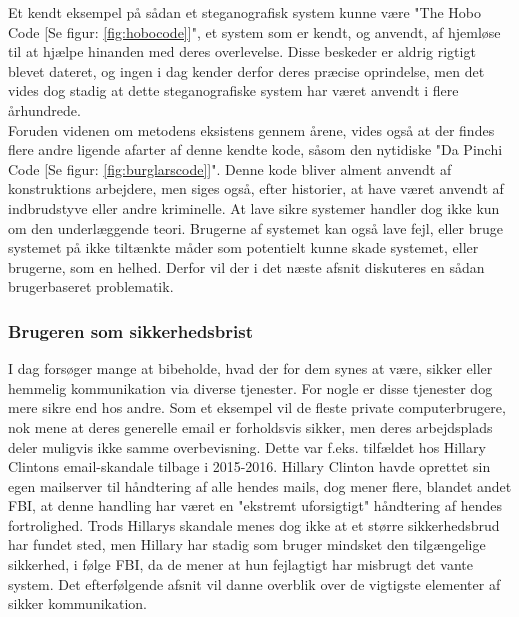Et kendt eksempel på sådan et steganografisk system kunne være "The Hobo Code [Se figur: \ref{fig:hobocode}]", et system som er kendt, og anvendt, af hjemløse til at hjælpe hinanden med deres overlevelse\cite{TheHoboCode}. Disse beskeder er aldrig rigtigt blevet dateret, og ingen i dag kender derfor deres præcise oprindelse, men det vides dog stadig at dette steganografiske system har været anvendt i flere århundrede.\\ 
Foruden videnen om metodens eksistens gennem årene, vides også at der findes flere andre ligende afarter af denne kendte kode, såsom den nytidiske "Da Pinchi Code [Se figur: \ref{fig:burglarscode}]". Denne kode bliver alment anvendt af konstruktions arbejdere, men siges også, efter historier, at have været anvendt af indbrudstyve eller andre kriminelle.\cite{DaPinchiCode} At lave sikre systemer handler dog ikke kun om den underlæggende teori. Brugerne af systemet kan også lave fejl, eller bruge systemet på ikke tiltænkte måder som potentielt kunne skade systemet, eller brugerne, som en helhed. Derfor vil der i det næste afsnit diskuteres en sådan brugerbaseret problematik. 

\subsubsection{Brugeren som sikkerhedsbrist}
\label{Brugeren_som_sikkerhedsbrist}
I dag forsøger mange at bibeholde, hvad der for dem synes at være, sikker eller hemmelig kommunikation via diverse tjenester. For nogle er disse tjenester dog mere sikre end hos andre. Som et eksempel vil de fleste private computerbrugere, nok mene at deres generelle email er forholdsvis sikker, men deres arbejdsplads deler muligvis ikke samme overbevisning. Dette var f.eks. tilfældet hos Hillary Clintons email-skandale tilbage i 2015-2016.\cite{Hillary_Email_History} Hillary Clinton havde oprettet sin egen mailserver til håndtering af alle hendes mails, dog mener flere, blandet andet FBI, at denne handling har været en "ekstremt uforsigtigt" håndtering af hendes fortrolighed. Trods Hillarys skandale menes dog ikke at et større sikkerhedsbrud har fundet sted, men Hillary har stadig som bruger mindsket den tilgængelige sikkerhed, i følge FBI, da de mener at hun fejlagtigt har misbrugt det vante system.\cite{Hillary_Email_skandale} Det efterfølgende afsnit vil danne overblik over de vigtigste elementer af sikker kommunikation.

